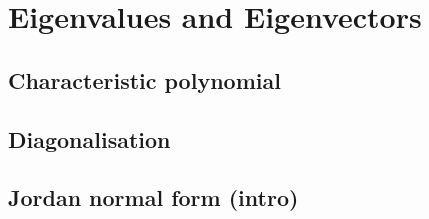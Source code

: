 
\section{Eigenvalues and Eigenvectors}

\subsection{Characteristic polynomial}


\subsection{Diagonalisation}


\subsection{Jordan normal form (intro)}

